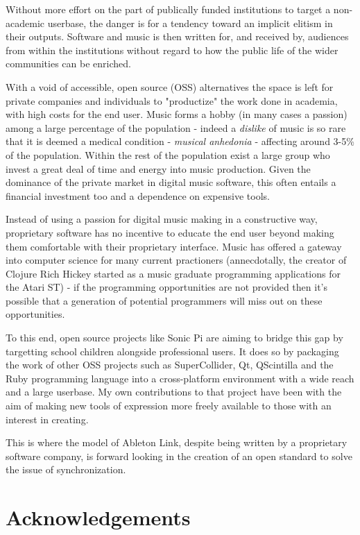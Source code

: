 \documentclass[11pt]{article} %
\theoremstyle{plain}
\theoremstyle{definition}
\begin{document}
Without more effort on the part of publically funded institutions to target a
non-academic userbase, the danger is for a tendency toward an implicit elitism
in their outputs. Software and music is then written for, and received by,
audiences from within the institutions without regard to how the public life of
the wider communities can be enriched.

With a void of accessible, open source (OSS) alternatives the space is left for
private companies and individuals to "productize" the work done in academia,
with high costs for the end user. Music forms a hobby (in many cases a passion)
among a large percentage of the population - indeed a \textit{dislike} of music
is so rare that it is deemed a medical condition - \textit{musical anhedonia} -
affecting around 3-5\% of the population. Within the rest of the
population exist a large group who invest a great deal of time and energy into
music production. Given the dominance of the private market in digital music
software, this often entails a financial investment too and a dependence on
expensive tools.

Instead of using a passion for digital music making in a constructive way,
proprietary software has no incentive to educate the end user beyond making
them comfortable with their proprietary interface. Music has offered a
gateway into computer science for many current practioners (annecdotally, the
creator of Clojure Rich Hickey started as a music graduate programming
applications for the Atari ST) - if the programming opportunities are not
provided then it's possible that a generation of potential programmers will
miss out on these opportunities.

To this end, open source projects like Sonic Pi\cite{sonicpi} are aiming to
bridge this gap by targetting school children alongside professional users. It
does so by packaging the work of other OSS projects such as SuperCollider, Qt,
QScintilla and the Ruby programming language into a cross-platform environment
with a wide reach and a large userbase. My own contributions to that project
have been with the aim of making new tools of expression more freely available
to those with an interest in creating.

This is where the model of Ableton Link, despite being written by a proprietary
software company, is forward looking in the creation of an open standard to
solve the issue of synchronization.

\section{Acknowledgements}
\end{document}
